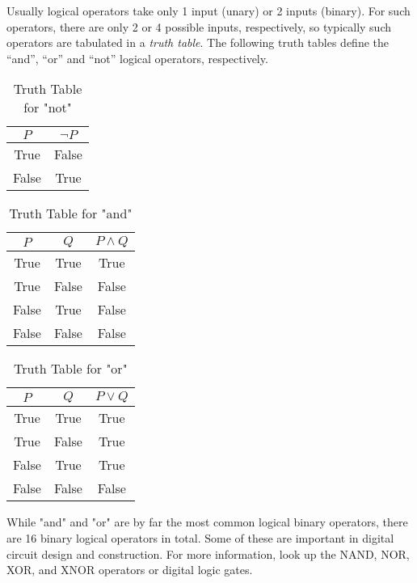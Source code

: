 Usually logical operators take only 1 input (unary) or 2 inputs (binary). For such operators,
there are only 2 or 4 possible inputs, respectively, so typically such operators are
tabulated in a \emph{truth table}. The following truth tables define the ``and'', ``or''
and ``not'' logical operators, respectively.
\begin{table}[H]
  \centering
  \begin{tabular}{cc}
    \toprule
   \(P\) & \( \lnot P \)  \\
    \midrule
    True & False \\
    False & True \\
    \bottomrule
  \end{tabular}
  \caption{Truth Table for "not"}
\end{table}

\begin{table}[H]
  \centering
  \begin{tabular}{ccc}
    \toprule
    \(P\) & \(Q\) & \( P \land Q \)  \\
    \midrule
    True & True & True \\
    True & False & False \\
    False & True & False \\
    False & False & False \\
    \bottomrule
  \end{tabular}
  \caption{Truth Table for "and"}
\end{table}

\begin{table}[H]
  \centering
  \begin{tabular}{ccc}
    \toprule
    \(P\) & \(Q\) & \( P \lor Q \)  \\
    \midrule
    True & True & True \\
    True & False & True \\
    False & True & True \\
    False & False & False \\
    \bottomrule
  \end{tabular}
  \caption{Truth Table for "or"}
\end{table}

\begin{advancedTopic}
  While "and" and "or" are by far the most common logical binary operators,
  there are 16 binary logical operators in total. Some of these are important
  in digital circuit design and construction. For more information, look up
  the NAND, NOR, XOR, and XNOR operators or digital logic gates.
\end{advancedTopic}

